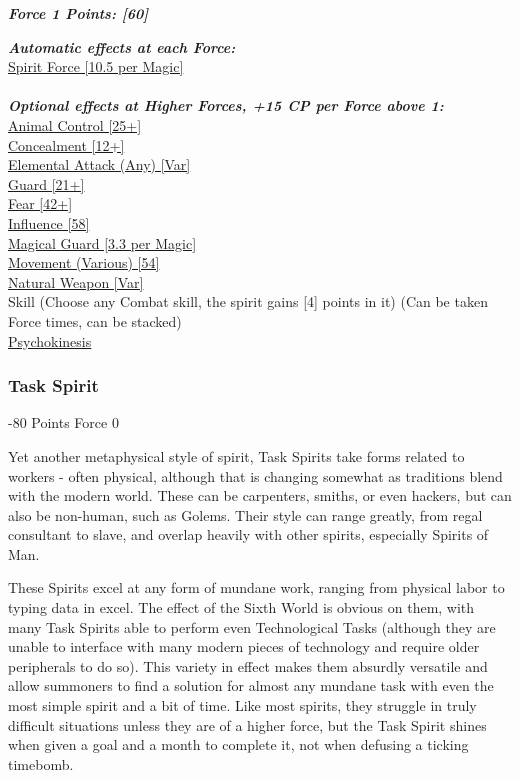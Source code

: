 \begin{multicols}{3}
	\textbf{\textit{Force 1 Points: [60]}}
	
	\textbf{\textit{Automatic effects at each Force:\\}}
	\hyperref[spirit_force]{Spirit Force [10.5 per Magic]}\\\\
	
	\textbf{\textit{Optional effects at Higher Forces, +15 CP per Force above 1:\\}}
	\hyperref[animal_control]{Animal Control [25+]}\\
	\hyperref[concealment]{Concealment [12+]}\\
	\hyperref[elemental_attack]{Elemental Attack (Any) [Var]}\\
	\hyperref[guard]{Guard [21+]}\\
	\hyperref[fear]{Fear [42+]}\\
	\hyperref[influence]{Influence [58]}\\
	\hyperref[magical_guard]{Magical Guard [3.3 per Magic]}\\
	\hyperref[movement]{Movement (Various) [54]}\\
	\hyperref[natural_weapon]{Natural Weapon [Var]}\\
	Skill (Choose any Combat skill, the spirit gains [4] points in it) (Can be taken Force times, can be stacked)\\
	\hyperref[psychokinesis]{Psychokinesis}\\
	
	\subsubsection{Task Spirit}
	\begin{flushright}
		-80 Points Force 0
	\end{flushright}
	
	Yet another metaphysical style of spirit, Task Spirits take forms related to workers - often physical, although that is changing somewhat as traditions blend with the modern world. These can be carpenters, smiths, or even hackers, but can also be non-human, such as Golems. Their style can range greatly, from regal consultant to slave, and overlap heavily with other spirits, especially Spirits of Man.
	
	These Spirits excel at any form of mundane work, ranging from physical labor to typing data in excel. The effect of the Sixth World is obvious on them, with many Task Spirits able to perform even Technological Tasks (although they are unable to interface with many modern pieces of technology and require older peripherals to do so). This variety in effect makes them absurdly versatile and allow summoners to find a solution for almost any mundane task with even the most simple spirit and a bit of time. Like most spirits, they struggle in truly difficult situations unless they are of a higher force, but the Task Spirit shines when given a goal and a month to complete it, not when defusing a ticking timebomb.
	

\end{multicols}
